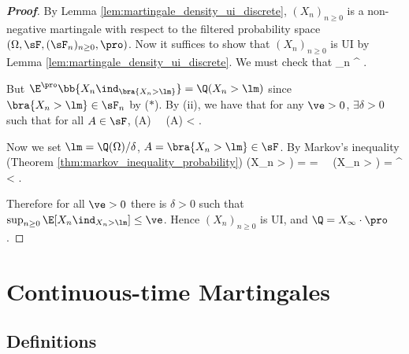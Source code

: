 \begin{proof}[\bf Proof]
By Lemma \ref{lem:martingale_density_ui_discrete}, $(X_n)_{n\geq 0}$ is a non-negative martingale with respect to the filtered probability space $(\Omega,\sF,(\sF_n)_{n\geq 0},\pro)$. Now it suffices to show that $(X_n)_{n\geq 0}$ is UI by Lemma \ref{lem:martingale_density_ui_discrete}. We must check that
\be
\sup_{n} \E^\pro{} \lm \to \infty.
\ee

But $\E^\pro\bb{X_n\ind_{\bra{X_n>\lm}}} = \Q(X_n > \lm)$ since ${\bra{X_n>\lm}}\in \sF_n$ by ($*$). By (ii), we have that for any $\ve>0$, $\exists \delta >0$ such that for all $A\in \sF$,
\be
\pro(A) \leq \delta \ \ra \ \Q(A) < \ve.
\ee

Now we set $\lm = \Q(\Omega)/\delta$, $A = \bra{X_n > \lm}\in \sF$. By Markov's inequality (Theorem \ref{thm:markov_inequality_probability})
\be
\pro(X_n > \lm) \leq {}  = \frac {\Q(\Omega)}{\lm} = \delta \ \ra \ \Q(X_n > \lm) = \E^\pro{} < \ve.
\ee


Therefore for all $\ve > 0$ there is $\delta > 0$ such that $\sup_{n\geq 0} \E[X_n\ind_{X_n>\lm}] \leq \ve$. Hence $(X_n)_{n\geq 0}$ is UI, and $\Q = X_\infty \cdot \pro$.
\end{proof}



\section{Continuous-time Martingales}

\subsection{Definitions}

